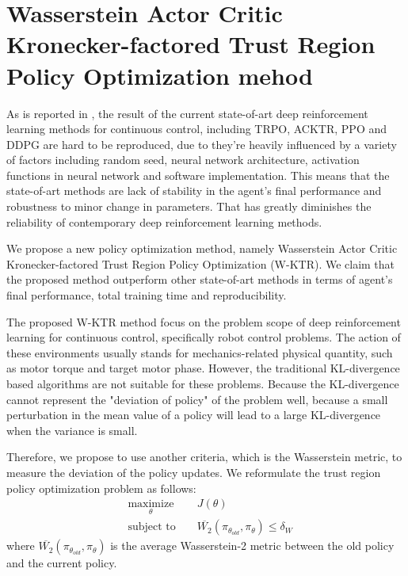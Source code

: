 \section{Wasserstein Actor Critic Kronecker-factored Trust Region Policy Optimization mehod }
As is reported in \cite{henderson2017matters}, the result of the current state-of-art deep reinforcement learning methods for continuous control, including TRPO, ACKTR, PPO and DDPG are hard to be reproduced, due to they're heavily influenced by a variety of factors including random seed, neural network architecture, activation functions in neural network and software implementation. This means that the state-of-art methods are lack of stability in the agent's final performance and robustness to minor change in parameters. That has greatly diminishes the reliability of contemporary deep reinforcement learning methods.

We propose a new policy optimization method, namely Wasserstein Actor Critic Kronecker-factored Trust Region Policy Optimization (W-KTR). We claim that the proposed method outperform other state-of-art methods in terms of agent's final performance, total training time and reproducibility.

The proposed W-KTR method focus on the problem scope of deep reinforcement learning for continuous control, specifically robot control problems. The action of these environments usually stands for mechanics-related physical quantity, such as motor torque and target motor phase. However, the traditional KL-divergence based algorithms are not suitable for these problems. Because the KL-divergence cannot represent the "deviation of policy" of the problem well, because a small perturbation in the mean value of a policy will lead to a large KL-divergence when the variance  is small. 

Therefore, we propose to use another criteria, which is the Wasserstein metric, to measure the deviation of the policy updates.  We reformulate the trust region policy optimization problem as follows:
\begin{equation}
    \begin{aligned}
&    \underset{\theta}{\text{maximize}} 
&& J(\theta) \\
& \text{subject to } 
&& \overline{W_2}(\pi_{\theta_{old}},\pi_\theta) \leq \delta_{W}\end{aligned}
\end{equation}
where $ \overline{W_2}(\pi_{\theta_{old}},\pi_\theta)$ is the average Wasserstein-2 metric between the old policy and the current policy.

